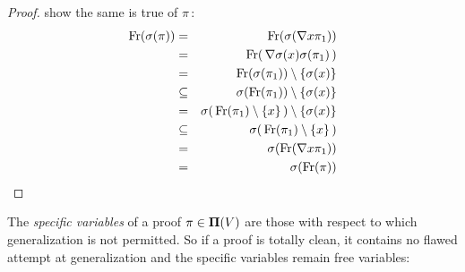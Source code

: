 \begin{proof}
show the same is true of $\pi$\,:
    \begin{eqnarray*}
    \mbox{\rm Fr}(\sigma(\pi))&=&\mbox{\rm Fr}(\sigma(\mbox{$\nabla$} x\pi_{1}))\\
    &=&\mbox{\rm Fr}(\,\mbox{$\nabla$}\sigma(x)\sigma(\pi_{1})\,)\\
    &=&\mbox{\rm Fr}(\sigma(\pi_{1}))\setminus\{\sigma(x)\}\\
    &\subseteq&\sigma(\mbox{\rm Fr}(\pi_{1}))\setminus\{\sigma(x)\}\\
    &=&\sigma(\,\mbox{\rm Fr}(\pi_{1})\setminus\{x\}\,)\setminus\{\sigma(x)\}\\
    &\subseteq&\sigma(\,\mbox{\rm Fr}(\pi_{1})\setminus\{x\}\,)\\
    &=&\sigma(\mbox{\rm Fr}(\mbox{$\nabla$} x\pi_{1}))\\
    &=&\sigma(\mbox{\rm Fr}(\pi))\\
    \end{eqnarray*}
\end{proof}

The {\em specific variables} of a proof $\pi\in\mbox{${\bf\Pi}(V)$}$ are those with
respect to which generalization is not permitted. So if a proof is
totally clean, it contains no flawed attempt at generalization and
the specific variables remain free variables:

